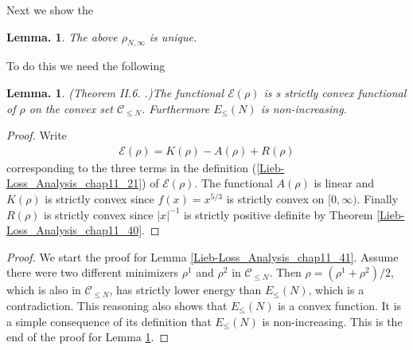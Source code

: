 \documentclass[openany, a4paper, oneside]{jsbook}
\theoremstyle{break}
\newtheorem{lem}[thm]{Lemma.}
\theoremstyle{breakdefn}
\newcommand{\abs}[1]{\left|#1\right|}
\newcommand{\calC}{\mathcal{C}}
\newcommand{\calE}{\mathcal{E}}
\newcommand{\EleqN}{E_{\leq}(N)}
\newcommand{\rhoNinfty}{\rho_{N, \infty}}
\begin{document}
Next we show the
\begin{lem}\label{Lieb-Loss_Analysis_chap11_38}
 The above $\rhoNinfty$ is unique.
\end{lem}
To do this we need the following
\begin{lem}\textup{(Theorem II.6. \cite{LiebSimon1}.)}\label{Lieb-Loss_Analysis_chap11_25}
 The functional $\calE (\rho)$ is s strictly convex functional of $\rho$ on the convex set $\calC_{\leq N}$.
 Furthermore $\EleqN$ is non-increasing.
\end{lem}
\begin{proof}
Write
\begin{align}
 \calE (\rho)
 =
 K (\rho) - A (\rho) + R (\rho)
\end{align}
corresponding to the three terms in the definition (\ref{Lieb-Loss_Analysis_chap11_21}) of $\calE (\rho)$.
The functional $A (\rho)$ is linear and $K (\rho)$ is strictly convex
since $f (x) = x^{5/3}$ is strictly convex on $[0, \infty)$.
Finally $R (\rho)$ is strictly convex since $\abs{x}^{-1}$ is strictly positive definite by Theorem \ref{Lieb-Loss_Analysis_chap11_40}.
\end{proof}

\begin{proof}
We start the proof for Lemma \ref{Lieb-Loss_Analysis_chap11_41}.
Assume there were two different minimizers $\rho^1$ and $\rho^2$ in $\calC_{\leq N}$.
Then $\rho = (\rho^1 + \rho^2) / 2$, which is also in $\calC_{\leq N}$, has strictly lower energy than $\EleqN$,
which is a contradiction.
This reasoning also shows that $\EleqN$ is a convex function.
It is a simple consequence of its definition that $\EleqN$ is non-increasing.
This is the end of the proof for Lemma \ref{Lieb-Loss_Analysis_chap11_38}.
\end{proof}
\end{document}
